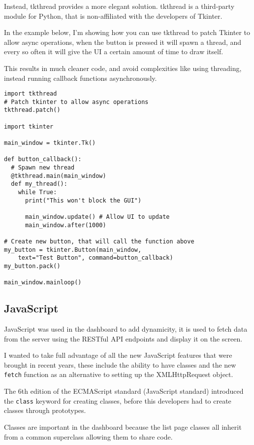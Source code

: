 Instead, tkthread provides a more elegant solution.
tkthread is a third-party module for Python,
that is non-affiliated with the developers of Tkinter.

In the example below, I'm showing how you can use tkthread to patch
Tkinter to allow async operations,
when the button is pressed it will spawn a thread,
and every so often it will give the
UI a certain amount of time to draw itself.

This results in much cleaner code,
and avoid complexities like using threading,
instead running callback functions asynchronously.

\begin{lstlisting}
import tkthread
# Patch tkinter to allow async operations
tkthread.patch()

import tkinter

main_window = tkinter.Tk()

def button_callback():
  # Spawn new thread
  @tkthread.main(main_window)
  def my_thread():
    while True:
      print("This won't block the GUI")
      
      main_window.update() # Allow UI to update
      main_window.after(1000)

# Create new button, that will call the function above
my_button = tkinter.Button(main_window,
    text="Test Button", command=button_callback)
my_button.pack()

main_window.mainloop()
\end{lstlisting}

\subsection{JavaScript}
JavaScript was used in the dashboard to add dynamicity,
it is used to fetch data from the server using the RESTful API endpoints
and display it on the screen.

I wanted to take full advantage of all the new JavaScript features that were brought in
recent years, these include the ability to have classes and
the new \texttt{fetch} function as an alternative to setting up the XMLHttpRequest object.

The 6th edition of the ECMAScript standard \cite{ES6} (JavaScript standard) 
introduced the \texttt{class} keyword for creating classes,
before this developers had to create classes through prototypes.

Classes are important in the dashboard because the list page classes
all inherit from a common superclass allowing them to share code.

